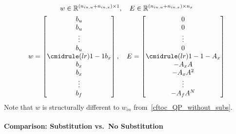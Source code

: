 \begin{gather*}
    w \in \mathbb{R}^{(n_{in,u} + n_{in,x})\times 1},\quad E \in \mathbb{R}^{(n_{in,u} + n_{in,x})\times n_x}\\
    w = \begin{bmatrix}
        b_u                    \\
        b_u                    \\
        \vdots                 \\
        b_u                    \\
        \cmidrule(lr){1-1} b_x \\
        b_x                    \\
        b_x                    \\
        \vdots                 \\
        b_f
    \end{bmatrix}, \quad
    E = \begin{bmatrix}
        0                       \\
        0                       \\
        \vdots                  \\
        0                       \\
        \cmidrule(lr){1-1} -A_x \\
        -A_x A                  \\
        -A_x A^2                \\
        \vdots                  \\
        -A_f A^N
    \end{bmatrix}
\end{gather*}
Note that $w$ is structurally different to $w_{in}$ from~\ref{cftoc_QP_without_subs}.

\paragraph{Comparison: Substitution vs.\ No Substitution}

